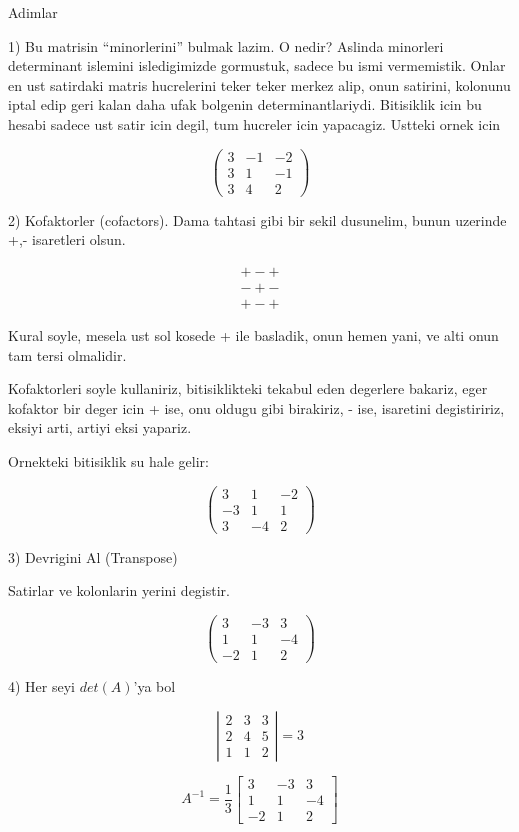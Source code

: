 \documentclass[12pt,fleqn]{article}\usepackage{../common}
\begin{document}
Adimlar

1) Bu matrisin ``minorlerini'' bulmak lazim. O nedir? Aslinda minorleri
determinant islemini isledigimizde gormustuk, sadece bu ismi vermemistik.
Onlar en ust satirdaki matris hucrelerini teker teker merkez alip, onun
satirini, kolonunu iptal edip geri kalan daha ufak bolgenin
determinantlariydi. Bitisiklik icin bu hesabi sadece ust satir icin degil,
tum hucreler icin yapacagiz. Ustteki ornek icin

\[ 
\left(\begin{array}{rrr}
3 & -1 & -2 \\
3 & 1 & -1 \\
3 & 4 & 2
\end{array}\right)
 \]

2) Kofaktorler (cofactors). Dama tahtasi gibi bir sekil dusunelim, bunun
uzerinde +,- isaretleri olsun. 

\[ 
\begin{array}{rr}
+ - + \\
- + - \\
+ - + 
\end{array}
 \]

Kural soyle, mesela ust sol kosede + ile basladik, onun hemen yani, ve alti
onun tam tersi olmalidir. 

Kofaktorleri soyle kullaniriz, bitisiklikteki tekabul eden degerlere
bakariz, eger kofaktor bir deger icin + ise, onu oldugu gibi birakiriz, -
ise, isaretini degistiririz, eksiyi arti, artiyi eksi yapariz. 

Ornekteki bitisiklik su hale gelir:

\[ 
\left(\begin{array}{rrr}
3 & 1 & -2 \\
-3 & 1 & 1 \\
3 & -4 & 2
\end{array}\right)
 \]

3) Devrigini Al (Transpose)

Satirlar ve kolonlarin yerini degistir. 

\[ 
\left(\begin{array}{rrr}
3 & -3 & 3 \\
1 & 1 & -4 \\
-2 & 1 & 2
\end{array}\right)
 \]

4) Her seyi $det(A)$'ya bol

\[ 
\left|\begin{array}{rrr}
2 & 3 & 3 \\
2 & 4 & 5 \\
1 & 1 & 2
\end{array}\right| = 3
 \]


\[ A^{-1} = 
\frac{1}{3}
\left[\begin{array}{rrr}
3 & -3 & 3 \\
1 & 1 & -4 \\
-2 & 1 & 2
\end{array}\right]
 \]
\end{document}
